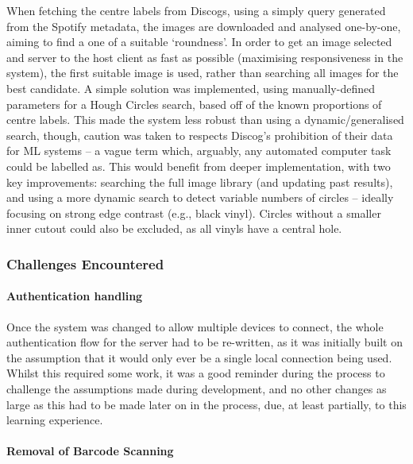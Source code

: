             When fetching the centre labels from Discogs, using a simply query generated from the Spotify metadata, the images are downloaded and analysed one-by-one, aiming to find a one of a suitable `roundness'. In order to get an image selected and server to the host client as fast as possible (maximising responsiveness in the system), the first suitable image is used, rather than searching all images for the best candidate. A simple solution was implemented, using manually-defined parameters for a Hough Circles search, based off of the known proportions of centre labels. This made the system less robust than using a dynamic/generalised search, though, caution was taken to respects Discog's prohibition of their data for ML systems \cite{discogsToS} -- a vague term which, arguably, any automated computer task could be labelled as. This would benefit from deeper implementation, with two key improvements: searching the full image library (and updating past results), and using a more dynamic search to detect variable numbers of circles -- ideally focusing on strong edge contrast (e.g., black vinyl). Circles without a smaller inner cutout could also be excluded, as all vinyls have a central hole.
    
            \subsubsection{Challenges Encountered}
    
                \paragraph{Authentication handling}
    
                Once the system was changed to allow multiple devices to connect, the whole authentication flow for the server had to be re-written, as it was initially built on the assumption that it would only ever be a single local connection being used. Whilst this required some work, it was a good reminder during the process to challenge the assumptions made during development, and no other changes as large as this had to be made later on in the process, due, at least partially, to this learning experience.
    
                \paragraph{Removal of Barcode Scanning}
    
